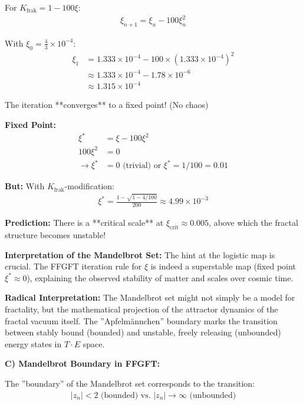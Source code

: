 	For $K_{\text{frak}} = 1 - 100\xi$:
	\begin{align*}
		\xi_{n+1} = \xi_n - 100 \xi_n^2
	\end{align*}
	
	With $\xi_0 = \frac{4}{3} \times 10^{-4}$:
	\begin{align*}
		\xi_1 &= 1.333 \times 10^{-4} - 100 \times (1.333 \times 10^{-4})^2 \\
		&\approx 1.333 \times 10^{-4} - 1.78 \times 10^{-6} \\
		&\approx 1.315 \times 10^{-4}
	\end{align*}
	
	The iteration **converges** to a fixed point! (No chaos)
	
	\textbf{Fixed Point:}
	\begin{align*}
		\xi^* &= \xi - 100\xi^2 \\
		100\xi^2 &= 0 \\
		\rightarrow \xi^* &= 0 \text{ (trivial) or } \xi^* = 1/100 = 0.01
	\end{align*}
	
	\textbf{But:} With $K_{\text{frak}}$-modification:
	\begin{align*}
		\xi^* = \frac{1 - \sqrt{1 - 4/100}}{200} \approx 4.99 \times 10^{-3}
	\end{align*}
	
	\textbf{Prediction:} There is a **critical scale** at $\xi_{\text{crit}} \approx 0.005$, above which the fractal structure becomes unstable!
	
	\textbf{Interpretation of the Mandelbrot Set:}
	The hint at the logistic map is crucial. The FFGFT iteration rule for $\xi$ is indeed a superstable map (fixed point $\xi^* \approx 0$), explaining the observed stability of matter and scales over cosmic time.
	
	\textbf{Radical Interpretation:} The Mandelbrot set might not simply be a model for fractality, but the mathematical projection of the attractor dynamics of the fractal vacuum itself. The ''Apfelmännchen'' boundary marks the transition between stably bound (bounded) and unstable, freely releasing (unbounded) energy states in $T \cdot E$ space.
	
	\textbf{C) Mandelbrot Boundary in FFGFT:}
	
	The ''boundary'' of the Mandelbrot set corresponds to the transition:
	\begin{align*}
		|z_n| < 2 \text{ (bounded) vs. } |z_n| \to \infty \text{ (unbounded)}
	\end{align*}
	
